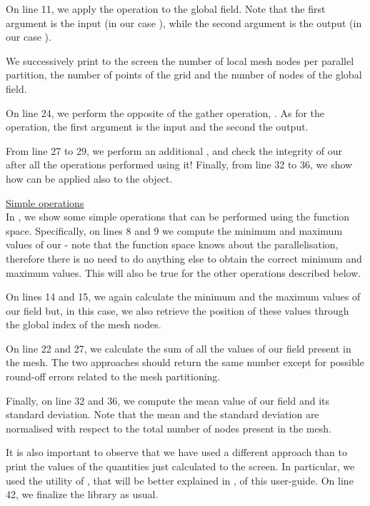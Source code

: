 \begin{description}
On line 11, we apply the  operation to the global field.
Note that the first argument is the input (in our case ),
while the second argument is the output (in our case ).

We successively print to the screen the number of local mesh nodes 
per parallel partition, the number of points of the grid and the 
number of nodes of the global field.

On line 24, we perform the opposite of the gather operation, 
. As for the  operation, the 
first argument is the input and the second the output.

From line 27 to 29, we perform an additional , 
and check the integrity of our  after all the 
operations performed using it! 
Finally, from line 32 to 36, we show how  can be applied 
also to the  object.

%

%
%
\item \underline{Simple operations}\\[0.5em]
%
In , we show some simple operations that 
can be performed using the  function space. Specifically, 
on lines 8 and 9 we compute the minimum and maximum values of our 
 - note that the function space knows about 
the parallelisation, therefore there is no need to do anything 
else to obtain the correct minimum and maximum values. This will
also be true for the other operations described below.

On lines 14 and 15, we again calculate the minimum and the maximum 
values of our field but, in this case, we also retrieve the position 
of these values through the global index of the mesh nodes.

On line 22 and 27, we calculate the sum of all the values of our 
field present in the mesh. The two approaches should return the 
same number except for possible round-off errors related to the 
mesh partitioning.

Finally, on line 32 and 36, we compute the mean value of our
field and its standard deviation. Note that the mean and the 
standard deviation are normalised with respect to the total 
number of nodes present in the mesh.

It is also important to observe that we have used a different 
approach than  to print the values of the quantities 
just calculated to the screen. In particular, we used the 
 utility of \Atlas, that will be better 
explained in , of this user-guide.
On line 42, we finalize the library as usual.
%

%
\end{description}
